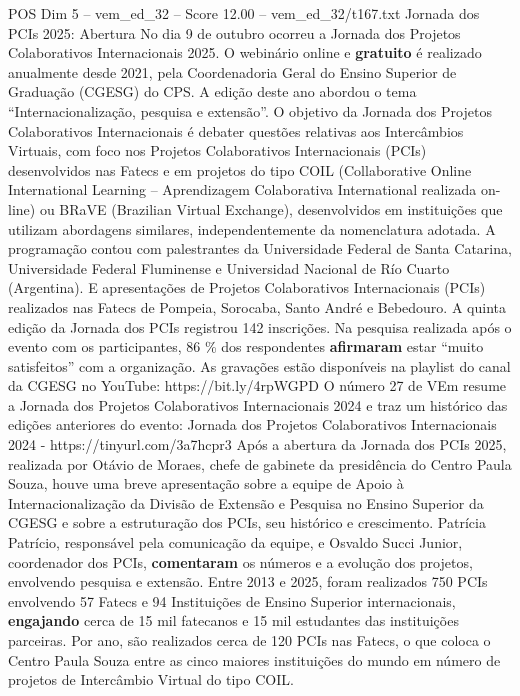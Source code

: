 \begin{textsample}{POS Dim 5 – vem\_ed\_32 – Score 12.00 – vem\_ed\_32/t167.txt}  \label{ex:f5_pos_024}
Jornada dos PCIs 2025: Abertura No dia 9 de outubro ocorreu a Jornada dos Projetos Colaborativos Internacionais 2025.
O webinário online e \textbf{gratuito} é realizado anualmente desde 2021, pela Coordenadoria Geral do Ensino Superior de Graduação (CGESG) do CPS.
A edição deste ano abordou o tema “Internacionalização, pesquisa e extensão”.
O objetivo da Jornada dos Projetos Colaborativos Internacionais é debater questões relativas aos Intercâmbios Virtuais, com foco nos Projetos Colaborativos Internacionais (PCIs) desenvolvidos nas Fatecs e em projetos do tipo COIL (Collaborative Online International Learning – Aprendizagem Colaborativa International realizada on-line) ou BRaVE (Brazilian Virtual Exchange), desenvolvidos em instituições que utilizam abordagens similares, independentemente da nomenclatura adotada.
A programação contou com palestrantes da Universidade Federal de Santa Catarina, Universidade Federal Fluminense e Universidad Nacional de Río Cuarto (Argentina).
E apresentações de Projetos Colaborativos Internacionais (PCIs) realizados nas Fatecs de Pompeia, Sorocaba, Santo André e Bebedouro.
A quinta edição da Jornada dos PCIs registrou 142 inscrições.
Na pesquisa realizada após o evento com os participantes, 86 \% dos respondentes \textbf{afirmaram} estar “muito satisfeitos” com a organização.
As gravações estão disponíveis na playlist do canal da CGESG no YouTube: https://bit.ly/4rpWGPD O número 27 de VEm resume a Jornada dos Projetos Colaborativos Internacionais 2024 e traz um histórico das edições anteriores do evento: Jornada dos Projetos Colaborativos Internacionais 2024 - https://tinyurl.com/3a7hcpr3 Após a abertura da Jornada dos PCIs 2025, realizada por Otávio de Moraes, chefe de gabinete da presidência do Centro Paula Souza, houve uma breve apresentação sobre a equipe de Apoio à Internacionalização da Divisão de Extensão e Pesquisa no Ensino Superior da CGESG e sobre a estruturação dos PCIs, seu histórico e crescimento.
Patrícia Patrício, responsável pela comunicação da equipe, e Osvaldo Succi Junior, coordenador dos PCIs, \textbf{comentaram} os números e a evolução dos projetos, envolvendo pesquisa e extensão.
Entre 2013 e 2025, foram realizados 750 PCIs envolvendo 57 Fatecs e 94 Instituições de Ensino Superior internacionais, \textbf{engajando} cerca de 15 mil fatecanos e 15 mil estudantes das instituições parceiras.
Por ano, são realizados cerca de 120 PCIs nas Fatecs, o que coloca o Centro Paula Souza entre as cinco maiores instituições do mundo em número de projetos de Intercâmbio Virtual do tipo COIL.

\end{textsample}
